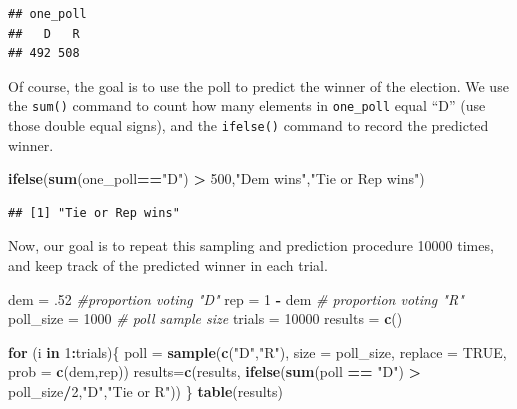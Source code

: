 \documentclass[
]{book}
\newenvironment{Shaded}{\begin{snugshade}}{\end{snugshade}}
\newcommand{\AttributeTok}[1]{\textcolor[rgb]{0.13,0.29,0.53}{#1}}
\newcommand{\CommentTok}[1]{\textcolor[rgb]{0.56,0.35,0.01}{\textit{#1}}}
\newcommand{\ConstantTok}[1]{\textcolor[rgb]{0.56,0.35,0.01}{#1}}
\newcommand{\ControlFlowTok}[1]{\textcolor[rgb]{0.13,0.29,0.53}{\textbf{#1}}}
\newcommand{\DecValTok}[1]{\textcolor[rgb]{0.00,0.00,0.81}{#1}}
\newcommand{\FunctionTok}[1]{\textcolor[rgb]{0.13,0.29,0.53}{\textbf{#1}}}
\newcommand{\NormalTok}[1]{#1}
\newcommand{\OtherTok}[1]{\textcolor[rgb]{0.56,0.35,0.01}{#1}}
\newcommand{\SpecialCharTok}[1]{\textcolor[rgb]{0.81,0.36,0.00}{\textbf{#1}}}
\newcommand{\StringTok}[1]{\textcolor[rgb]{0.31,0.60,0.02}{#1}}
\theoremstyle{definition}
\theoremstyle{definition}
\theoremstyle{definition}
\theoremstyle{definition}
\theoremstyle{remark}
\begin{document}
\begin{verbatim}
## one_poll
##   D   R 
## 492 508
\end{verbatim}

Of course, the goal is to use the poll to predict the winner of the election.
We use the \texttt{sum()} command to count how many elements in \texttt{one\_poll} equal ``D'' (use those double equal signs), and the \texttt{ifelse()} command to record the predicted winner.

\begin{Shaded}
\begin{Highlighting}[]
\FunctionTok{ifelse}\NormalTok{(}\FunctionTok{sum}\NormalTok{(one\_poll}\SpecialCharTok{==}\StringTok{"D"}\NormalTok{) }\SpecialCharTok{\textgreater{}} \DecValTok{500}\NormalTok{,}\StringTok{"Dem wins"}\NormalTok{,}\StringTok{"Tie or Rep wins"}\NormalTok{)}
\end{Highlighting}
\end{Shaded}

\begin{verbatim}
## [1] "Tie or Rep wins"
\end{verbatim}

Now, our goal is to repeat this sampling and prediction procedure 10000 times, and keep track of the predicted winner in each trial.

\begin{Shaded}
\begin{Highlighting}[]
\NormalTok{dem }\OtherTok{=}\NormalTok{ .}\DecValTok{52} \CommentTok{\#proportion voting "D"}
\NormalTok{rep }\OtherTok{=} \DecValTok{1} \SpecialCharTok{{-}}\NormalTok{ dem }\CommentTok{\# proportion voting "R"}
\NormalTok{poll\_size }\OtherTok{=} \DecValTok{1000} \CommentTok{\# poll sample size}
\NormalTok{trials }\OtherTok{=} \DecValTok{10000}
\NormalTok{results }\OtherTok{=} \FunctionTok{c}\NormalTok{()}

\ControlFlowTok{for}\NormalTok{ (i }\ControlFlowTok{in} \DecValTok{1}\SpecialCharTok{:}\NormalTok{trials)\{}
\NormalTok{  poll }\OtherTok{=} \FunctionTok{sample}\NormalTok{(}\FunctionTok{c}\NormalTok{(}\StringTok{"D"}\NormalTok{,}\StringTok{"R"}\NormalTok{),}
                \AttributeTok{size =}\NormalTok{ poll\_size,}
                \AttributeTok{replace =} \ConstantTok{TRUE}\NormalTok{,}
                \AttributeTok{prob =} \FunctionTok{c}\NormalTok{(dem,rep))}
\NormalTok{  results}\OtherTok{=}\FunctionTok{c}\NormalTok{(results,}
            \FunctionTok{ifelse}\NormalTok{(}\FunctionTok{sum}\NormalTok{(poll }\SpecialCharTok{==} \StringTok{"D"}\NormalTok{) }\SpecialCharTok{\textgreater{}}\NormalTok{ poll\_size}\SpecialCharTok{/}\DecValTok{2}\NormalTok{,}\StringTok{"D"}\NormalTok{,}\StringTok{"Tie or R"}\NormalTok{))}
\NormalTok{\}}
\FunctionTok{table}\NormalTok{(results)}
\end{Highlighting}
\end{Shaded}
\end{document}
